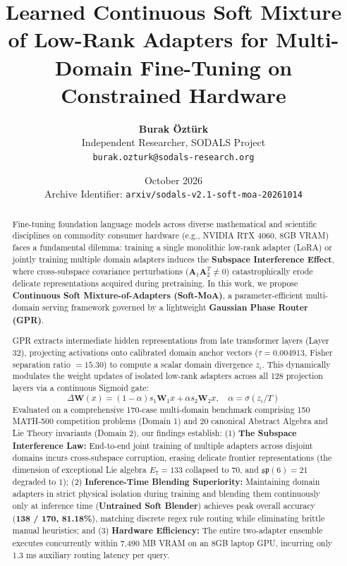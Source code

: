 \documentclass[11pt,a4paper]{article}
\title{\textbf{Learned Continuous Soft Mixture of Low-Rank Adapters for Multi-Domain Fine-Tuning on Constrained Hardware}}
\author{
    \textbf{Burak \"Ozt\"urk} \\
    Independent Researcher, SODALS Project \\
    \texttt{burak.ozturk@sodals-research.org}
}
\date{October 2026 \\ \vspace{0.5em} \small Archive Identifier: \texttt{arxiv/sodals-v2.1-soft-moa-20261014}}
\begin{document}
\maketitle

\begin{abstract}
Fine-tuning foundation language models across diverse mathematical and scientific disciplines on commodity consumer hardware (e.g., NVIDIA RTX 4060, 8GB VRAM) faces a fundamental dilemma: training a single monolithic low-rank adapter (LoRA) or jointly training multiple domain adapters induces the \textbf{Subspace Interference Effect}, where cross-subspace covariance perturbations ($\mathbf{A}_1 \mathbf{A}_2^T \neq 0$) catastrophically erode delicate representations acquired during pretraining. In this work, we propose \textbf{Continuous Soft Mixture-of-Adapters (Soft-MoA)}, a parameter-efficient multi-domain serving framework governed by a lightweight \textbf{Gaussian Phase Router (GPR)}.

GPR extracts intermediate hidden representations from late transformer layers (Layer 32), projecting activations onto calibrated domain anchor vectors ($\tau = 0.004913$, Fisher separation ratio $= 15.30$) to compute a scalar domain divergence $z_i$. This dynamically modulates the weight updates of isolated low-rank adapters across all 128 projection layers via a continuous Sigmoid gate:
\[
\Delta \mathbf{W}(x) = (1 - \alpha) s_1 \mathbf{W}_1 x + \alpha s_2 \mathbf{W}_2 x, \quad \alpha = \sigma(z_i / T)
\]
Evaluated on a comprehensive 170-case multi-domain benchmark comprising 150 MATH-500 competition problems (Domain 1) and 20 canonical Abstract Algebra and Lie Theory invariants (Domain 2), our findings establish:
(1) \textbf{The Subspace Interference Law:} End-to-end joint training of multiple adapters across disjoint domains incurs cross-subspace corruption, erasing delicate frontier representations (the dimension of exceptional Lie algebra $E_7 = 133$ collapsed to $70$, and $\mathfrak{sp}(6) = 21$ degraded to $1$);
(2) \textbf{Inference-Time Blending Superiority:} Maintaining domain adapters in strict physical isolation during training and blending them continuously only at inference time (\textbf{Untrained Soft Blender}) achieves peak overall accuracy (\textbf{138 / 170, 81.18\%}), matching discrete regex rule routing while eliminating brittle manual heuristics; and
(3) \textbf{Hardware Efficiency:} The entire two-adapter ensemble executes concurrently within 7,490 MB VRAM on an 8GB laptop GPU, incurring only 1.3 ms auxiliary routing latency per query.
\end{abstract}
\end{document}
